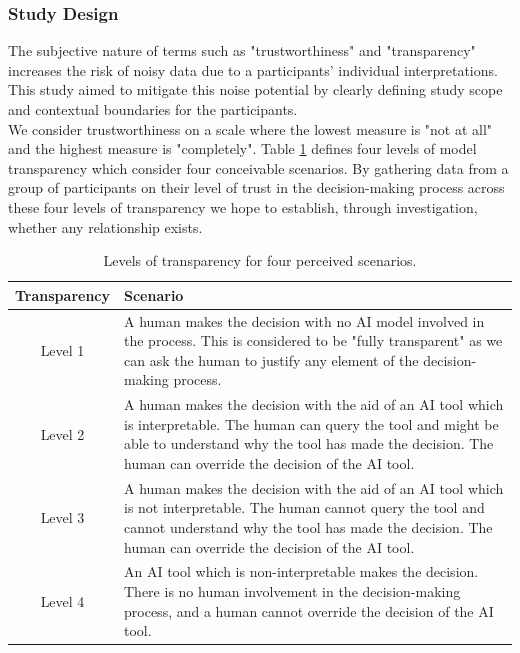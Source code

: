 \documentclass[manuscript,screen,review]{acmart}
\begin{document}
\subsubsection{Study Design} 
\label{study1_design}
The subjective nature of terms such as "trustworthiness" and "transparency" increases the risk of noisy data due to a participants' individual interpretations. This study aimed to mitigate this noise potential by clearly defining study scope and contextual boundaries for the participants.\\

We consider trustworthiness on a scale where the lowest measure is "not at all" and the highest measure is "completely". Table \ref{table:transparency_levels} defines four levels of model transparency which consider four conceivable scenarios. By gathering data from a group of participants on their level of trust in the decision-making process across these four levels of transparency we hope to establish, through investigation, whether any relationship exists. 

\begin{table}
\begin{center}
\begin{tabular}{ | c || p{11cm} |}
\hline
 Transparency & Scenario \\
\hline
\hline
 Level 1 & A human makes the decision with no AI model involved in the process. This is considered to be "fully transparent" as we can ask the human to justify any element of the decision-making process.  \\  
 \hline
 Level 2 & A human makes the decision with the aid of an AI tool which is interpretable. The human can query the tool and might be able to understand why the tool has made the decision. The human can override the decision of the AI tool. \\
 \hline
 Level 3 & A human makes the decision with the aid of an AI tool which is not interpretable. The human cannot query the tool and cannot understand why the tool has made the decision. The human can override the decision of the AI tool.  \\
 \hline
 Level 4 & An AI tool which is non-interpretable makes the decision. There is no human involvement in the decision-making process, and a human cannot override the decision of the AI tool. \\
\hline
\end{tabular}
\caption{Levels of transparency for four perceived scenarios.}
\label{table:transparency_levels}
\end{center}
\end{table}
\end{document}
